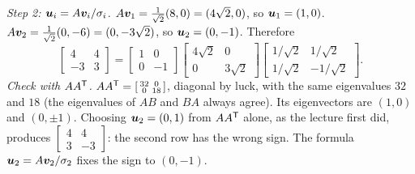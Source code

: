 \begin{example}
\emph{Step 2: $\boldsymbol{u}_i=A\boldsymbol{v}_i/\sigma_i$.} $A\boldsymbol{v}_1=\tfrac{1}{\sqrt2}(8,0)=(4\sqrt2,0)$, so $\boldsymbol{u}_1=(1,0)$.
$A\boldsymbol{v}_2=\tfrac{1}{\sqrt2}(0,-6)=(0,-3\sqrt2)$, so $\boldsymbol{u}_2=(0,-1)$. Therefore
\[
  \begin{bmatrix}4&4\\-3&3\end{bmatrix}
  =\begin{bmatrix}1&0\\0&-1\end{bmatrix}
   \begin{bmatrix}4\sqrt2&0\\0&3\sqrt2\end{bmatrix}
   \begin{bmatrix}1/\sqrt2&1/\sqrt2\\1/\sqrt2&-1/\sqrt2\end{bmatrix}.
\]
\emph{Check with $AA^{\mathsf{T}}$.} $AA^{\mathsf{T}}=\left[\begin{smallmatrix}32&0\\0&18\end{smallmatrix}\right]$, diagonal by luck,
with the same eigenvalues $32$ and $18$ (the eigenvalues of $AB$ and $BA$ always agree). Its
eigenvectors are $(1,0)$ and $(0,\pm1)$. Choosing $\boldsymbol{u}_2=(0,1)$ from $AA^{\mathsf{T}}$ alone, as the
lecture first did, produces $\left[\begin{smallmatrix}4&4\\3&-3\end{smallmatrix}\right]$: the second row has
the wrong sign. The formula $\boldsymbol{u}_2=A\boldsymbol{v}_2/\sigma_2$ fixes the sign to $(0,-1)$.
\end{example}


